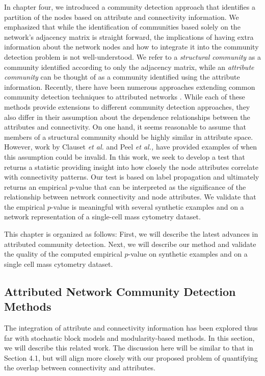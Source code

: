 In chapter four, we introduced a community detection approach that identifies a partition of the nodes based on attribute and connectivity information. We emphasized that while the identification of communities based solely on the network's adjacency matrix is straight forward, the implications of having extra information about the network nodes and how to integrate it into the community detection problem is not well-understood. We refer to a \emph{structural community} as a community identified according to only the adjacency matrix, while an \emph{attribute community} can be thought of as a community identified using the attribute information. Recently, there have been numerous approaches extending common community detection techniques to attributed networks \cite{hric,peel2017ground,ilouvain,cesna,clauset,perozziAttribute}. While each of these methods provide extensions to different community detection approaches, they also differ in their assumption about the dependence relationships between the attributes and connectivity. On one hand, it seems reasonable to assume that members of a structural community should be highly similar in attribute space. However, work by Clauset \emph{et al.} \cite{clauset} and Peel \emph{et al.,} \cite{peel2017ground} have provided examples of when this assumption could be invalid. In this work, we seek to develop a test that returns a statistic providing insight into how closely the node attributes correlate with connectivity patterns. Our test is based on label propagation and ultimately returns an empirical $p$-value that can be interpreted as the significance of the relationship between network connectivity and node attributes. We validate that the empirical $p$-value is meaningful with several synthetic examples and on a network representation of a single-cell mass cytometry dataset. 

This chapter is organized as follows: First, we will describe the latest advances in attributed community detection. Next, we will describe our method and validate the quality of the computed empirical $p$-value on synthetic examples and on a single cell mass cytometry dataset. 

\subsection{Attributed Network Community Detection Methods}
The integration of attribute and connectivity information has been explored thus far with stochastic block models and modularity-based methods. In this section, we will describe this related work. The discussion here will be similar to that in Section 4.1, but will align more closely with our proposed problem of quantifying the overlap between connectivity and attributes.  


